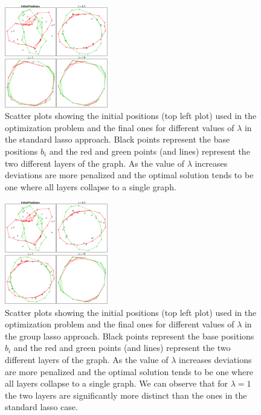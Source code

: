 \documentclass{article}
\begin{document}
\begin{figure}[h!]
   \centering
   \includegraphics[width=0.4\textwidth]{plot_positions_individual} %
   \caption{Scatter plots showing the initial positions (top left plot) used in the optimization problem and the final ones for different values of $\lambda$ in the standard lasso approach. Black points represent the base positions $b_i$ and the red and green points (and lines) represent the two different layers of the graph. As the value of $\lambda$ increases deviations are more penalized and the optimal solution tends to be one where all layers collapse to a single graph.}
   \label{fig:pos_lasso}
\end{figure}
%
\begin{figure}[h!]
   \centering
   \includegraphics[width=0.4\textwidth]{plot_positions_group} %
   \caption{Scatter plots showing the initial positions (top left plot) used in the optimization problem and the final ones for different values of $\lambda$ in the group lasso approach. Black points represent the base positions $b_i$ and the red and green points (and lines) represent the two different layers of the graph. As the value of $\lambda$ increases deviations are more penalized and the optimal solution tends to be one where all layers collapse to a single graph. We can observe that for $\lambda=1$ the two layers are significantly more distinct than the ones in the standard lasso case.}
   \label{fig:pos_group}
\end{figure}
\end{document}
